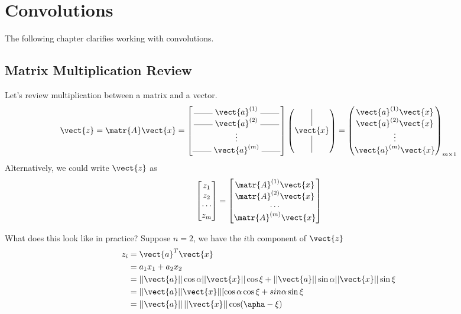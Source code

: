 \chapter{Convolutions}

The following chapter clarifies working with convolutions.
\section{Matrix Multiplication Review}
Let's review multiplication between a matrix and a vector.
\[
\vect{z} = {\matr{A}}\vect{x} =
\begin{bmatrix}
    \rule[0.5mm]{0.8cm}{0.1mm} \; {\vect{a}}^{(1)} \; \rule[0.5mm]{0.8cm}{0.1mm} \\
    \rule[0.5mm]{0.8cm}{0.1mm} \; {\vect{a}}^{(2)} \; \rule[0.5mm]{0.8cm}{0.1mm} \\
    \vdots \\
    \rule[0.5mm]{0.8cm}{0.1mm} \; {\vect{a}}^{(m)} \; \rule[0.5mm]{0.8cm}{0.1mm} \\
\end{bmatrix}
\begin{pmatrix}
    \vrule height 0.6cm \\ \vect{x} \\ \vrule height 0.6cm
\end{pmatrix} =
\begin{pmatrix}
    {\vect{a}}^{(1)} \vect{x} \\ {\vect{a}}^{(2)} \vect{x} \\ \vdots \\ {\vect{a}}^{(m)} \vect{x}
\end{pmatrix}_{m \times 1}
\]
Alternatively, we could write $\vect{z}$ as 
\[\begin{bmatrix} z_1 \\ z_2 \\ \cdots \\z_m\end{bmatrix} = \begin{bmatrix} \matr{A}^{(1)}\vect{x} \\ \matr{A}^{(2)}\vect{x} \\\cdots \\\matr{A}^{(m)}\vect{x}\end{bmatrix}\]

What does this look like in practice?
Suppose $n=2$, we have the $i$th component of $\vect{z}$ 
\begin{align}
z_i & = \vect{a}^T\vect{x} \\
& = a_1x_1 + a_2x_2 \\
&= ||\vect{a}|| \cos \alpha ||\vect{x}|| \cos\xi + ||\vect{a}|| \sin \alpha  ||\vect{x}|| \sin\xi \\
&= ||\vect{a}||\vect{x}|| [\cos\alpha \cos\xi + sin\alpha \sin\xi \\
&=||\vect{a}||\,||\vect{x}||\cos(\apha-\xi)
\end{align}


